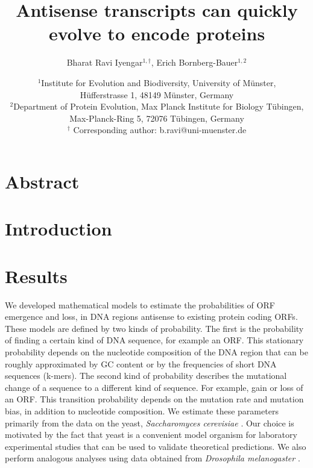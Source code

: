 \documentclass[12pt,a4paper]{article}
\title{Antisense transcripts can quickly evolve to encode proteins}
\author{Bharat Ravi Iyengar$^{1,\dagger}$, Erich Bornberg-Bauer$^{1,2}$}
\date{\small $^1$Institute for Evolution and Biodiversity, University of M\"{u}nster,\\ H\"{u}fferstrasse 1, 48149 M\"{u}nster, Germany\\[1ex] $^2$Department of Protein Evolution, Max Planck Institute for Biology T\"{u}bingen, Max-Planck-Ring 5, 72076 T\"{u}bingen, Germany \\[1ex] $^\dagger$ Corresponding author: b.ravi@uni-muenster.de}
\begin{document}
\onehalfspacing
\def\figdir{../Figures/M2_main/pdf}

\setlength{\abovedisplayskip}{0pt}
\setlength{\belowdisplayskip}{1em}

\maketitle


\linenumbers

\section*{Abstract}




\section*{Introduction}



\section*{Results}

We developed mathematical models to estimate the probabilities of ORF emergence and loss, in DNA regions antisense to existing protein coding ORFs. These models are defined by two kinds of probability. The first is the probability of finding a certain kind of DNA sequence, for example an ORF. This stationary probability depends on the nucleotide composition of the DNA region that can be roughly approximated by GC content or by the frequencies of short DNA sequences (k-mers). The second kind of probability describes the mutational change of a sequence to a different kind of sequence. For example, gain or loss of an ORF. This transition probability depends on the mutation rate and mutation bias, in addition to nucleotide composition. We estimate these parameters primarily from the data on the yeast, \textit{Saccharomyces cerevisiae} \citep{scermutrate}. Our choice is motivated by the fact that yeast is a convenient model organism for laboratory experimental studies that can be used to validate theoretical predictions. We also perform analogous analyses using data obtained from \textit{Drosophila melanogaster} \citep[][Supplementary section XX]{drosophilamutrate}.
\end{document}
